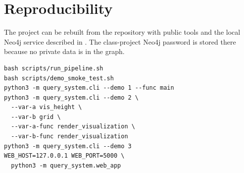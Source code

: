 \documentclass[11pt,twocolumn]{article}
\begin{document}
\section{Reproducibility}

The project can be rebuilt from the repository with public tools and the local
Neo4j service described in . The class-project Neo4j
password is stored there because no private data is in the graph.

\begin{verbatim}
bash scripts/run_pipeline.sh
bash scripts/demo_smoke_test.sh
python3 -m query_system.cli --demo 1 --func main
python3 -m query_system.cli --demo 2 \
  --var-a vis_height \
  --var-b grid \
  --var-a-func render_visualization \
  --var-b-func render_visualization
python3 -m query_system.cli --demo 3
WEB_HOST=127.0.0.1 WEB_PORT=5000 \
  python3 -m query_system.web_app
\end{verbatim}
\end{document}
